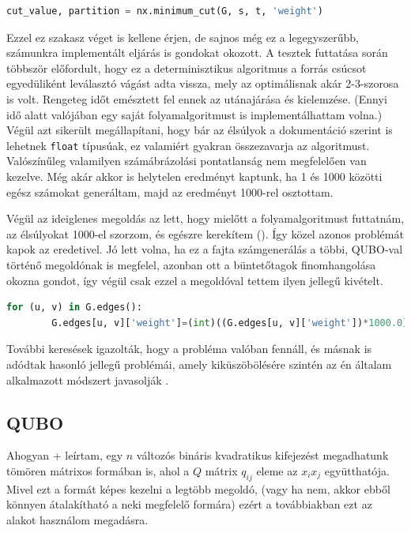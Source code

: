 \vspace{5pt}
\begin{lstlisting}[language=Python,caption=Minimális vágás folyamalgoritmussal,label=code:minCutFlow]
	cut_value, partition = nx.minimum_cut(G, s, t, 'weight')
\end{lstlisting}

Ezzel ez szakasz véget is kellene érjen, de sajnos még ez a legegyszerűbb, számunkra implementált eljárás is gondokat okozott. A tesztek futtatása során többször előfordult, hogy ez a determinisztikus algoritmus a forrás csúcsot egyedüliként leválasztó vágást adta vissza, mely az optimálisnak akár 2-3-szorosa is volt. Rengeteg időt emésztett fel ennek az utánajárása és kielemzése. (Ennyi idő alatt valójában egy saját folyamalgoritmust is implementálhattam volna.) Végül azt sikerült megállapítani, hogy bár az élsúlyok a dokumentáció szerint is lehetnek \verb+float+ típusúak, ez valamiért gyakran összezavarja az algoritmust. Valószínűleg valamilyen számábrázolási pontatlanság nem megfelelően van kezelve. Még akár akkor is helytelen eredményt kaptunk, ha 1 és 1000 közötti egész számokat generáltam, majd az eredményt 1000-rel osztottam.

Végül az ideiglenes megoldás az lett, hogy mielőtt a folyamalgoritmust futtatnám, az élsúlyokat 1000-el szorzom, és egészre kerekítem (). Így közel azonos problémát kapok az eredetivel. Jó lett volna, ha ez a fajta számgenerálás a többi, QUBO-val történő megoldónak is megfelel, azonban ott a büntetőtagok finomhangolása okozna gondot, így végül csak ezzel a megoldóval tettem ilyen jellegű kivételt.

\vspace{5pt}
\begin{lstlisting}[language=Python,caption=Súlyok egésszé konvertálása,label=code:minCutFlowFloat]
	for (u, v) in G.edges():
		G.edges[u, v]['weight']=(int)((G.edges[u, v]['weight'])*1000.0)
\end{lstlisting}


További keresések igazolták, hogy a probléma valóban fennáll, és másnak is adódtak hasonló jellegű problémái, amely kiküszöbölésére szintén az én általam alkalmazott módszert javasolják \cite{NetworkXFloat}.

\subsection{QUBO}
Ahogyan \az+ leírtam, egy $n$ változós bináris kvadratikus kifejezést megadhatunk tömören mátrixos formában is, ahol a $Q$ mátrix $q_{ij}$ eleme az $x_i x_j$ együtthatója. Mivel ezt a formát képes kezelni a legtöbb megoldó, (vagy ha nem, akkor ebből könnyen átalakítható a neki megfelelő formára) ezért a továbbiakban ezt az alakot használom megadásra.

